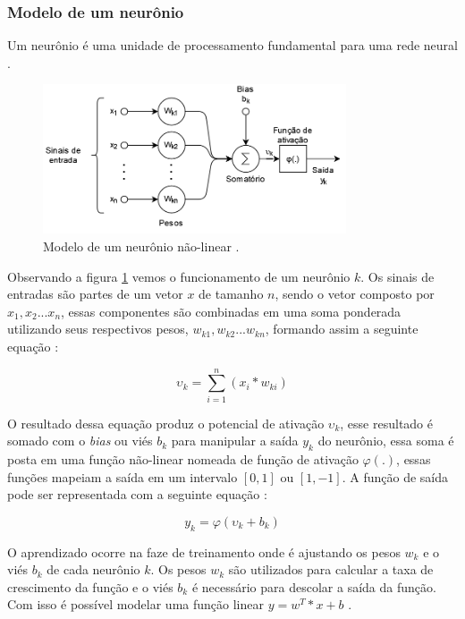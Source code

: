 \documentclass[
	12pt,				%
	openright,			%
	twoside,			%
	a4paper,			%
	english,			%
	french,				%
	spanish,			%
	brazil				%
	]{abntex2}
\begin{document}
\subsubsection{Modelo de um neurônio}

Um neurônio é uma unidade de processamento fundamental para uma rede neural \cite{haykin1999neural}.

\begin{figure}[H]
	\centering
	\includegraphics[width=0.8\textwidth]{figures/neuronio.png}
	\caption{Modelo de um neurônio não-linear \cite{haykin1999neural}.}
	\label{fig:neuronio}
\end{figure}

Observando a figura \ref{fig:neuronio} vemos o funcionamento de um neurônio $k$. Os sinais de entradas são partes de um vetor $x$ de tamanho $n$, sendo o vetor composto por $x_1, x_2 ... x_n$, essas componentes são combinadas em uma soma ponderada utilizando seus respectivos pesos, $w_{k1}, w_{k2}...w_{kn}$, formando assim a seguinte equação  :

$$\upsilon_k = \sum_{i=1}^n (x_i * w_{ki})$$

O resultado dessa equação produz o potencial de ativação $\upsilon_k$, esse resultado é somado com o \textit{bias} ou viés $b_k$ para manipular a saída $y_k$ do neurônio, essa soma é posta em uma função não-linear nomeada de função de ativação $\varphi(.)$, essas funções mapeiam a saída em um intervalo $[0, 1]$ ou $[1, -1]$. A função de saída pode ser representada com a seguinte equação :

$$y_k = \varphi(\upsilon_k + b_k)$$

O aprendizado ocorre na faze de treinamento onde é ajustando os pesos $w_k$ e o viés $b_k$ de cada neurônio $k$. Os pesos $w_k$ são utilizados para calcular a taxa de crescimento da função e o viés $b_k$ é necessário para descolar a saída da função. Com isso é possível modelar uma função linear $y=w^T*x+b$ \cite{marti2017aprendizado}.
\end{document}
